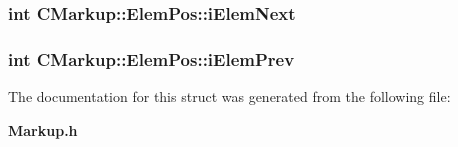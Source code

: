 \subsubsection[iElemNext]{\setlength{\rightskip}{0pt plus 5cm}int {\bf CMarkup::ElemPos::iElemNext}}\label{structCMarkup_1_1ElemPos_c61f6c9ee6421801e94d7df7afa4f1ed}


\subsubsection[iElemPrev]{\setlength{\rightskip}{0pt plus 5cm}int {\bf CMarkup::ElemPos::iElemPrev}}\label{structCMarkup_1_1ElemPos_45534bddcab1f12a8452a070368488ca}




The documentation for this struct was generated from the following file:\begin{CompactItemize}
\item 
{\bf Markup.h}\end{CompactItemize}
